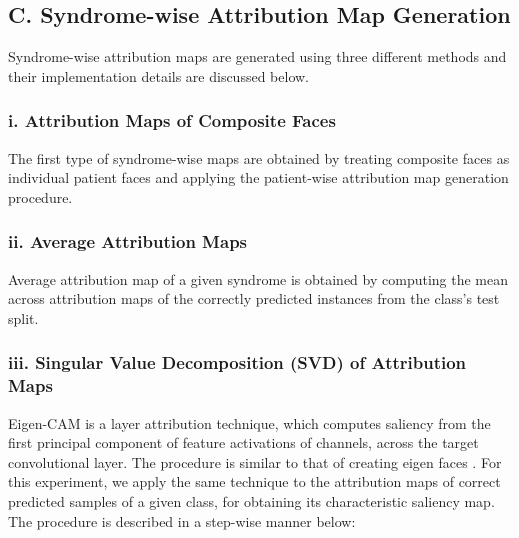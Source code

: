 \documentclass[../report.tex]{subfiles}
\begin{document}
    \subsection{C. Syndrome-wise Attribution Map Generation}
    Syndrome-wise attribution maps are generated using three different methods and their implementation details are discussed below.
    \subsubsection{i. Attribution Maps of Composite Faces}
    The first type of syndrome-wise maps are obtained by treating composite faces as individual patient faces and applying the patient-wise attribution map generation procedure.
    \subsubsection{ii. Average Attribution Maps}
    Average attribution map of a given syndrome is obtained by computing the mean across attribution maps of the correctly predicted instances from the class's test split.
    \subsubsection{iii. Singular Value Decomposition (SVD) of Attribution Maps}
	Eigen-CAM \cite{muhammad2020eigen} is a layer attribution technique, which computes saliency from the first principal component of feature activations of channels, across the target convolutional layer. The procedure is similar to that of creating eigen faces \cite{eig_faces}. For this experiment, we apply the same technique to the attribution maps of correct predicted samples of a given class, for obtaining its characteristic saliency map. The procedure is described in a step-wise manner below:
\end{document}
